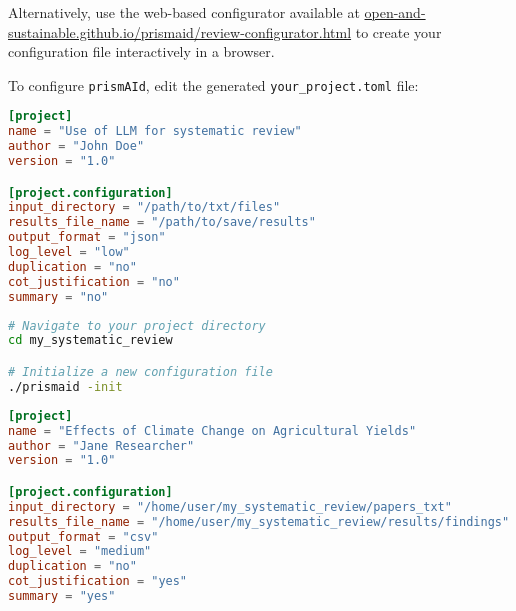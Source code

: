 Alternatively, use the web-based configurator available at \href{https://open-and-sustainable.github.io/prismaid/review-configurator.html}{open-and-sustainable.github.io/prismaid/review-configurator.html} to create your configuration file interactively in a browser.

\begin{configbox}
To configure \texttt{prismAId}, edit the generated \texttt{your\_project.toml} file:
\begin{lstlisting}[language=TOML]
[project]
name = "Use of LLM for systematic review"
author = "John Doe"
version = "1.0"

[project.configuration]
input_directory = "/path/to/txt/files"
results_file_name = "/path/to/save/results"
output_format = "json"
log_level = "low"
duplication = "no"
cot_justification = "no"
summary = "no"
\end{lstlisting}
\end{configbox}
\begin{commandbox}
\begin{lstlisting}[language=Bash]
# Navigate to your project directory
cd my_systematic_review

# Initialize a new configuration file
./prismaid -init
\end{lstlisting}
\end{commandbox}

\begin{configbox}
\begin{lstlisting}[language=TOML]
[project]
name = "Effects of Climate Change on Agricultural Yields"
author = "Jane Researcher"
version = "1.0"

[project.configuration]
input_directory = "/home/user/my_systematic_review/papers_txt"
results_file_name = "/home/user/my_systematic_review/results/findings"
output_format = "csv"
log_level = "medium"
duplication = "no"
cot_justification = "yes"
summary = "yes"
\end{lstlisting}
\end{configbox}


